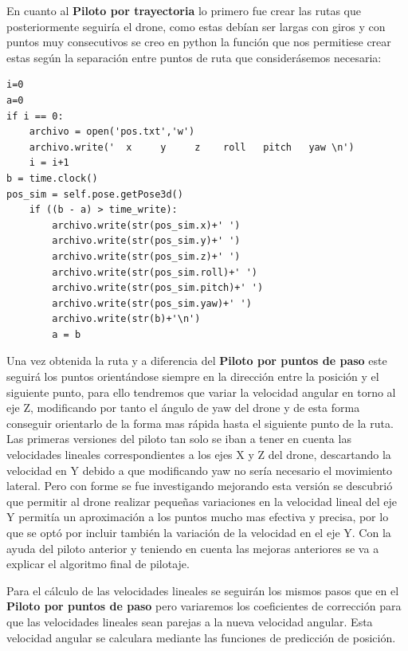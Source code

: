 \hspace{1cm} En cuanto al \textbf{Piloto por trayectoria} lo primero fue crear las rutas que posteriormente seguiría el drone, como estas debían ser largas con giros y con puntos muy consecutivos se creo en python la función que nos permitiese crear estas según la separación entre puntos de ruta que considerásemos necesaria: 
\begin{lstlisting}[backgroundcolor=\color{gray!15}]
i=0
a=0
if i == 0:
    archivo = open('pos.txt','w')
    archivo.write('  x     y     z    roll   pitch   yaw \n')
    i = i+1
b = time.clock()
pos_sim = self.pose.getPose3d()
    if ((b - a) > time_write):
        archivo.write(str(pos_sim.x)+' ')
        archivo.write(str(pos_sim.y)+' ')
        archivo.write(str(pos_sim.z)+' ')
        archivo.write(str(pos_sim.roll)+' ')
        archivo.write(str(pos_sim.pitch)+' ')
        archivo.write(str(pos_sim.yaw)+' ')
        archivo.write(str(b)+'\n')
        a = b 
\end{lstlisting}

\hspace{1cm} Una vez obtenida la ruta y a diferencia del \textbf{Piloto por puntos de paso} este seguirá los puntos orientándose siempre en la dirección entre la posición y el siguiente punto, para ello tendremos que variar la velocidad angular en torno al eje Z, modificando por tanto el ángulo de yaw del drone y de esta forma conseguir orientarlo de la forma mas rápida hasta el siguiente punto de la ruta. Las primeras versiones del piloto tan solo se iban a tener en cuenta las velocidades lineales correspondientes a los ejes X y Z del drone, descartando la velocidad en Y debido a que modificando yaw no sería necesario el movimiento lateral. Pero con forme se fue investigando  mejorando esta versión se descubrió que permitir al drone realizar pequeñas variaciones en la velocidad lineal del eje Y permitía un aproximación a los puntos mucho mas efectiva y precisa, por lo que se optó por incluir también la variación de la velocidad en el eje Y. Con la ayuda del piloto anterior y teniendo en cuenta las mejoras anteriores se va a explicar el algoritmo final de pilotaje. 

\hspace{1cm} Para el cálculo de las velocidades lineales se seguirán los mismos pasos que en el \textbf{Piloto por puntos de paso} pero variaremos los coeficientes de corrección para que las velocidades lineales sean parejas a la nueva velocidad angular. Esta velocidad angular se calculara mediante las funciones de predicción de posición. 

